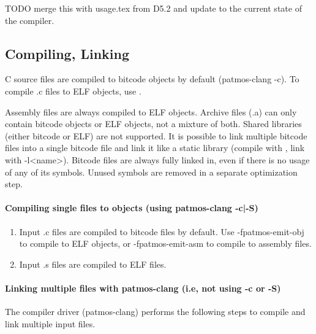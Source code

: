 TODO merge this with usage.tex from D5.2 and update to the current state of the compiler.


\subsection{Compiling, Linking}

C source files are compiled to bitcode objects by default (patmos-clang -c). To compile .c files
to ELF objects, use .

Assembly files are always compiled to ELF objects. Archive files (.a) can only contain bitcode objects
or ELF objects, not a mixture of both. Shared libraries (either bitcode or ELF) are not supported.
It is possible to link multiple bitcode files into a single bitcode file and link it like a static library
(compile with , link with -l<name>). Bitcode files are always
fully linked in, even if there is no usage of any of its symbols. Unused symbols are removed in a separate
optimization step.


\paragraph{Compiling single files to objects (using patmos-clang -c|-S)}

\begin{enumerate}
\item Input .c files are compiled to bitcode files by default. Use -fpatmos-emit-obj to compile
   to ELF objects, or -fpatmos-emit-asm to compile to assembly files.

\item Input .s files are compiled to ELF files.
\end{enumerate}


\paragraph{Linking multiple files with patmos-clang (i.e, not using -c or -S)}

The compiler driver (patmos-clang) performs the following steps to compile and link multiple input files.

